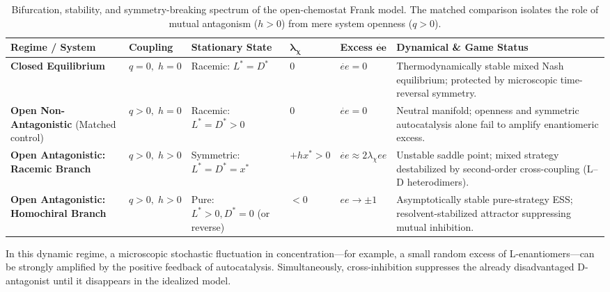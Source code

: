 \documentclass[12pt,a4paper]{article}
\theoremstyle{remark}
\begin{document}
\begin{table}[htbp]
\centering
\caption{Bifurcation, stability, and symmetry-breaking spectrum of the open-chemostat Frank model. The matched comparison isolates the role of mutual antagonism ($h > 0$) from mere system openness ($q > 0$).}
\label{tab:frank-bifurcation-spectrum}
\scriptsize
\setlength{\tabcolsep}{3pt}
\begin{tabularx}{\textwidth}{@{}>{\RaggedRight\arraybackslash}p{}>{\RaggedRight\arraybackslash}p{}>{\RaggedRight\arraybackslash}p{}>{\RaggedRight\arraybackslash}p{}>{\RaggedRight\arraybackslash}p{}>{\RaggedRight\arraybackslash}X@{}}
\toprule
\textbf{Regime / System} & \textbf{Coupling} & \textbf{Stationary State} & $\boldsymbol{\lambda_\chi}$ & \textbf{Excess $\mathbf{\dot{ee}}$} & \textbf{Dynamical \& Game Status} \\
\midrule
\textbf{Closed Equilibrium} & $q = 0,\; h = 0$ & Racemic: $L^* = D^*$ & $0$ & $\dot{ee} = 0$ & Thermodynamically stable mixed Nash equilibrium; protected by microscopic time-reversal symmetry. \\
\addlinespace
\textbf{Open Non-Antagonistic} (Matched control) & $q > 0,\; h = 0$ & Racemic: $L^* = D^* > 0$ & $0$ & $\dot{ee} = 0$ & Neutral manifold; openness and symmetric autocatalysis alone fail to amplify enantiomeric excess. \\
\addlinespace
\textbf{Open Antagonistic: Racemic Branch} & $q > 0,\; h > 0$ & Symmetric: $L^* = D^* = x^*$ & $+h x^* > 0$ & $\dot{ee} \approx 2\lambda_\chi ee$ & Unstable saddle point; mixed strategy destabilized by second-order cross-coupling ($\mathrm{L}$--$\mathrm{D}$ heterodimers). \\
\addlinespace
\textbf{Open Antagonistic: Homochiral Branch} & $q > 0,\; h > 0$ & Pure: $L^* > 0, D^* = 0$ (or reverse) & $< 0$ & $ee \to \pm 1$ & Asymptotically stable pure-strategy ESS; resolvent-stabilized attractor suppressing mutual inhibition. \\
\bottomrule
\end{tabularx}
\end{table}

In this dynamic regime, a microscopic stochastic fluctuation in concentration---for example, a small random excess of L-enantiomers---can be strongly amplified by the positive feedback of autocatalysis. Simultaneously, cross-inhibition suppresses the already disadvantaged D-antagonist until it disappears in the idealized model.
\end{document}
